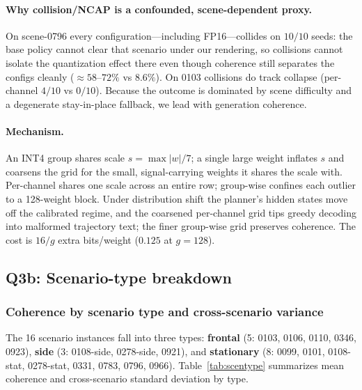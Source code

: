 \documentclass[11pt]{article}
\begin{document}
\paragraph{Why collision/NCAP is a confounded, scene-dependent proxy.} On scene-0796 every
configuration---including FP16---collides on $10/10$ seeds: the base policy cannot clear that
scenario under our rendering, so collisions cannot isolate the quantization effect there even though
coherence still separates the configs cleanly ($\approx 58$--$72\%$ vs $8.6\%$). On 0103 collisions
do track collapse (per-channel $4/10$ vs $0/10$). Because the outcome is dominated by scene
difficulty and a degenerate stay-in-place fallback, we lead with generation coherence.

\paragraph{Mechanism.} An INT4 group shares scale $s=\max|w|/7$; a single large weight inflates $s$
and coarsens the grid for the small, signal-carrying weights it shares the scale with. Per-channel
shares one scale across an entire row; group-wise confines each outlier to a 128-weight block.
Under distribution shift the planner's hidden states move off the calibrated regime, and the
coarsened per-channel grid tips greedy decoding into malformed trajectory text; the finer group-wise
grid preserves coherence. The cost is $16/g$ extra bits/weight ($0.125$ at $g{=}128$).

\subsection{Q3b: Scenario-type breakdown}

\subsubsection{Coherence by scenario type and cross-scenario variance}
The 16 scenario instances fall into three types: \textbf{frontal} (5: 0103, 0106, 0110, 0346,
0923), \textbf{side} (3: 0108-side, 0278-side, 0921), and \textbf{stationary} (8: 0099, 0101,
0108-stat, 0278-stat, 0331, 0783, 0796, 0966). Table~\ref{tab:scentype} summarizes mean coherence
and cross-scenario standard deviation by type.
\end{document}
